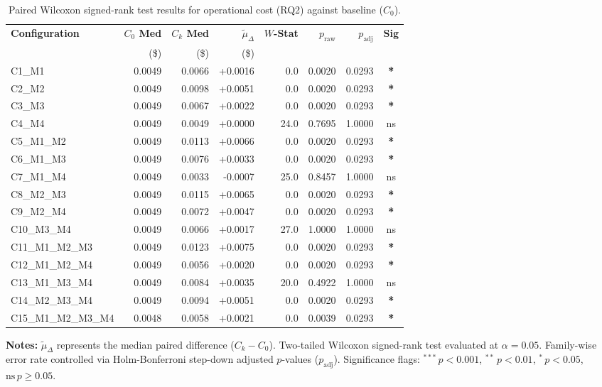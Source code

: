 \begin{table}[!htbp]
\centering
\small
\caption{Paired Wilcoxon signed-rank test results for operational cost (RQ2) against baseline ($C_0$).}
\label{tab:wilcoxon_rq2}
\begin{tabular*}{\textwidth}{@{\extracolsep{\fill}} l r r r r r r c @{}}
\toprule
\textbf{Configuration} & \textbf{$C_0$ Med} & \textbf{$C_k$ Med} & \textbf{$\tilde{\mu}_\Delta$} & \textbf{$W$-Stat} & \textbf{$p_{\text{raw}}$} & \textbf{$p_{\text{adj}}$} & \textbf{Sig} \\
 & \scriptsize{(\$)} & \scriptsize{(\$)} & \scriptsize{(\$)} & & & & \\
\midrule
C1\_M1 & 0.0049 & 0.0066 & +0.0016 & 0.0 & 0.0020 & 0.0293 & \textbf{*} \\
C2\_M2 & 0.0049 & 0.0098 & +0.0051 & 0.0 & 0.0020 & 0.0293 & \textbf{*} \\
C3\_M3 & 0.0049 & 0.0067 & +0.0022 & 0.0 & 0.0020 & 0.0293 & \textbf{*} \\
C4\_M4 & 0.0049 & 0.0049 & +0.0000 & 24.0 & 0.7695 & 1.0000 & ns \\
C5\_M1\_M2 & 0.0049 & 0.0113 & +0.0066 & 0.0 & 0.0020 & 0.0293 & \textbf{*} \\
C6\_M1\_M3 & 0.0049 & 0.0076 & +0.0033 & 0.0 & 0.0020 & 0.0293 & \textbf{*} \\
C7\_M1\_M4 & 0.0049 & 0.0033 & -0.0007 & 25.0 & 0.8457 & 1.0000 & ns \\
C8\_M2\_M3 & 0.0049 & 0.0115 & +0.0065 & 0.0 & 0.0020 & 0.0293 & \textbf{*} \\
C9\_M2\_M4 & 0.0049 & 0.0072 & +0.0047 & 0.0 & 0.0020 & 0.0293 & \textbf{*} \\
C10\_M3\_M4 & 0.0049 & 0.0066 & +0.0017 & 27.0 & 1.0000 & 1.0000 & ns \\
C11\_M1\_M2\_M3 & 0.0049 & 0.0123 & +0.0075 & 0.0 & 0.0020 & 0.0293 & \textbf{*} \\
C12\_M1\_M2\_M4 & 0.0049 & 0.0056 & +0.0020 & 0.0 & 0.0020 & 0.0293 & \textbf{*} \\
C13\_M1\_M3\_M4 & 0.0049 & 0.0084 & +0.0035 & 20.0 & 0.4922 & 1.0000 & ns \\
C14\_M2\_M3\_M4 & 0.0049 & 0.0094 & +0.0051 & 0.0 & 0.0020 & 0.0293 & \textbf{*} \\
C15\_M1\_M2\_M3\_M4 & 0.0048 & 0.0058 & +0.0021 & 0.0 & 0.0039 & 0.0293 & \textbf{*} \\
\bottomrule
\end{tabular*}
\vspace{0.5em}
\parbox{\textwidth}{\footnotesize
\textbf{Notes:} $\tilde{\mu}_\Delta$ represents the median paired difference ($C_k - C_0$). Two-tailed Wilcoxon signed-rank test evaluated at $\alpha = 0.05$. Family-wise error rate controlled via Holm-Bonferroni step-down adjusted $p$-values ($p_{\text{adj}}$). Significance flags: $^{***}\,p < 0.001$, $^{**}\,p < 0.01$, $^{*}\,p < 0.05$, $\text{ns}\,p \ge 0.05$.}
\end{table}
